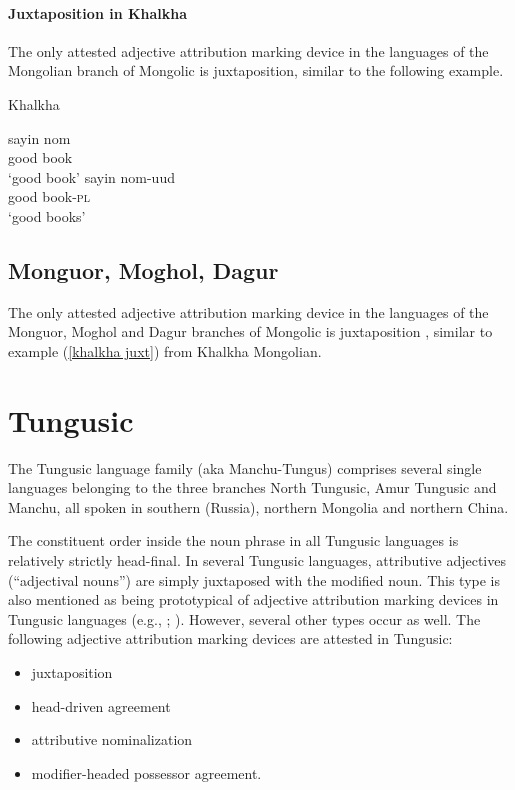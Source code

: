\paragraph*{Juxtaposition in Khalkha}\hspace{0.4cm}
The only attested adjective attribution marking device in the languages of the Mongolian branch of Mongolic is juxtaposition, similar to the following example.
\begin{exe}
\ex \rm{Khalkha \citep{svantesson2003}}
\label{khalkha juxt}
\begin{xlist}
\ex
\gll	sayin nom\\
	good book\\
\glt	‘good book’
\ex 
\gll	sayin nom-uud\\
	good book-\textsc{pl}\\
\glt ‘good books’
\end{xlist}
\end{exe}

\subsection{Monguor, Moghol, Dagur}
The only attested adjective attribution marking device in the languages of the Monguor, Moghol and Dagur branches of Mongolic is juxtaposition \citep{slater2003,weiers2003,tsumagari2003}, similar to example (\ref{khalkha juxt}) from Khalkha Mongolian.

\section{Tungusic}
\label{tungusic synchr}
The Tungusic language family (aka Manchu-Tungus) comprises several single languages belonging to the three branches North Tungusic, Amur Tungusic and Manchu, all spoken in southern  (Russia), northern Mongolia and northern China.

The constituent order inside the noun phrase in all Tungusic languages is relatively strictly head-final. In several Tungusic languages, attributive adjectives (“adjectival nouns”) are simply juxtaposed with the modified noun. This type is also mentioned as being prototypical of adjective attribution marking devices in Tungusic languages (e.g., \citealt{sunik1968a}; \citealt[133]{kormusin2005}). However, several other types occur as well. The following adjective attribution marking devices are attested in Tungusic:
\begin{itemize}
\item juxtaposition
\item head\hyp{}driven agreement
\item attributive nominalization
\item modifier\hyp{}headed possessor agreement.
\end{itemize}

